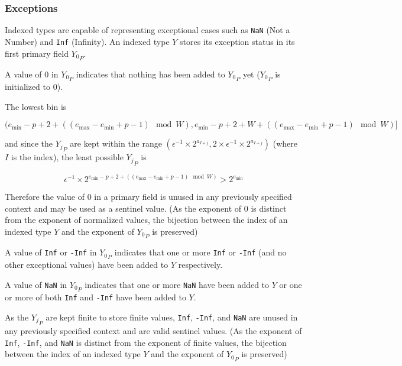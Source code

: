 \documentclass[12pt]{article}
\providecommand{\min}{\ensuremath{\text{min}}}
\providecommand{\max}{\ensuremath{\text{max}}}
\theoremstyle{definition}
\numberwithin{equation}{section}
\begin{document}
    \subsubsection{Exceptions}
      \label{sec:indexed_implementation_exceptions}
      Indexed types are capable of representing exceptional cases such as \verb|NaN| (Not a Number) and \verb|Inf| (Infinity). An indexed type $Y$ stores its exception status in its first primary field ${Y_0}_P$.

      A value of $0$ in ${Y_0}_P$ indicates that nothing has been added to ${Y_0}_P$ yet (${Y_0}_P$ is initialized to $0$).

      The lowest bin is

      \begin{equation*}
      (e_{\min} - p + 2 + ((e_{\max} - e_{\min} + p - 1 ) \mod W), e_{\min} - p + 2 + W + ((e_{\max} - e_{\min} + p - 1)\mod W)]
      \end{equation*}

      and since the ${Y_j}_P$ are kept within the range $(\epsilon^{-1} \times 2^{a_{I + j}}, 2 \times \epsilon^{-1} \times 2^{a_{I + j}})$ (where $I$ is the index), the least possible ${Y_j}_P$ is

      \begin{equation*}
      \epsilon^{-1} \times 2^{e_{\min} - p + 2 + ((e_{\max} - e_{\min} + p - 1)\mod W)} > 2^{e_{\min}}
      \end{equation*}

      Therefore the value of $0$ in a primary field is unused in any previously specified context and may be used as a sentinel value. (As the exponent of $0$ is distinct from the exponent of normalized values, the bijection between the index of an indexed type $Y$ and the exponent of ${Y_0}_P$ is preserved)

      A value of \verb|Inf| or \verb|-Inf| in ${Y_0}_P$ indicates that one or more \verb|Inf| or \verb|-Inf| (and no other exceptional values) have been added to $Y$ respectively.

      A value of \verb|NaN| in ${Y_0}_P$ indicates that one or more \verb|NaN| have been added to $Y$ or one or more of both \verb|Inf| and \verb|-Inf| have been added to $Y$.

      As the ${Y_j}_P$ are kept finite to store finite values, \verb|Inf|, \verb|-Inf|, and \verb|NaN| are unused in any previously specified context and are valid sentinel values. (As the exponent of \verb|Inf|, \verb|-Inf|, and \verb|NaN| is distinct from the exponent of finite values, the bijection between the index of an indexed type $Y$ and the exponent of ${Y_0}_P$ is preserved)
\end{document}
